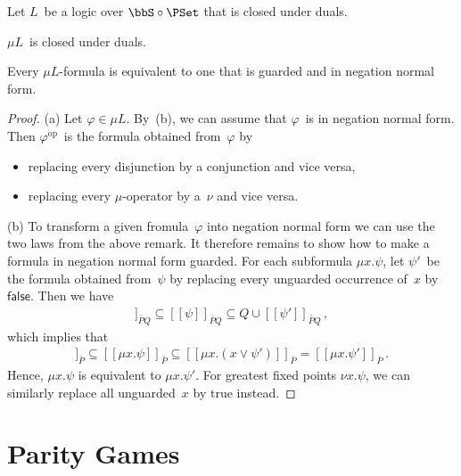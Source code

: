 \documentclass[10pt, fleqn]{scrartcl}
\newcommand*{\op}{\mathrm{op}}
\newcommand*{\?}{\kern .08em}
\newcommand\lsem{[\![}
\newcommand\rsem{]\!]}
\begin{document}
\begin{Lem}\label{Lem: normal form for mu L}
Let $L$~be a logic over $\bbS \circ \PSet$ that is closed under duals.
\begin{enuma}
\item $\mu L$~is closed under duals.
\item Every $\mu L$-formula is equivalent to one that is guarded and in negation normal form.
\end{enuma}
\end{Lem}
\begin{proof}
(a) Let $\varphi \in \mu L$. By~(b), we can assume that $\varphi$~is in negation normal form.
Then $\varphi^\op$~is the formula obtained from~$\varphi$ by
\begin{itemize}
\item replacing every disjunction by a conjunction and vice versa,
\item replacing every $\mu$-operator by a~$\nu$ and vice versa.
\end{itemize}

(b) To transform a given fromula~$\varphi$ into negation normal form we can use the two
laws from the above remark.
It therefore remains to show how to make a formula in negation normal form guarded.
For each subformula $\mu x.\psi$, let $\psi'$~be the formula obtained from~$\psi$ by replacing
every unguarded occurrence of~$x$ by $\mathsf{false}$. Then we have
\begin{align*}
  \lsem\psi'\rsem_{\bar PQ} \subseteq \lsem\psi\rsem_{\bar PQ}
                            \subseteq Q \cup \lsem\psi'\rsem_{\bar PQ}\,,
\end{align*}
which implies that
\begin{align*}
  \lsem\mu x.\psi'\rsem_{\bar P}
  \subseteq \lsem\mu x.\psi\rsem_{\bar P}
  \subseteq \lsem\mu x.(x \lor \psi')\rsem_{\bar P}
  = \lsem\mu x.\psi'\rsem_{\bar P}\,.
\end{align*}
Hence, $\mu x.\psi$ is equivalent to $\mu x.\psi'$.
For greatest fixed points $\nu x.\psi$, we can similarly replace all unguarded~$x$ by
$\mathrm{true}$ instead.
\end{proof}


\section{Parity Games}   %
\label{Sect: games}
\end{document}
